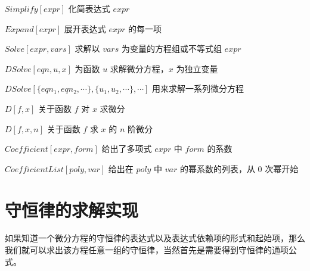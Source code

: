 $Simplify[expr]$  \quad   化简表达式 $expr$

$Expand[expr]$ \quad    展开表达式 $expr$ 的每一项

$Solve[expr, vars]$  \quad 求解以 $vars$ 为变量的方程组或不等式组 $expr$

$DSolve[eqn, u, x]$ \quad  为函数 $u$ 求解微分方程，$x$ 为独立变量

$DSolve[\{eqn_1, eqn_2, \cdots \}, \{u_1, u_2, \cdots \}, \cdots ]$ \quad  用来求解一系列微分方程

$D[f,x]$     \quad  关于函数 $f$ 对 $x$ 求微分

$D[f,{x,n}]$     \quad     关于函数 $f$ 求 $x$ 的 $n$ 阶微分

$Coefficient[expr, form]$   \quad  给出了多项式 $expr$ 中 $form$ 的系数

$CoefficientList[poly, var]$   \quad  给出在 $poly$ 中 $var$ 的幂系数的列表，从 0 次幂开始

\section{守恒律的求解实现}
如果知道一个微分方程的守恒律的表达式以及表达式依赖项的形式和起始项，那么我们就可以求出该方程任意一组的守恒律，当然首先是需要得到守恒律的通项公式。

